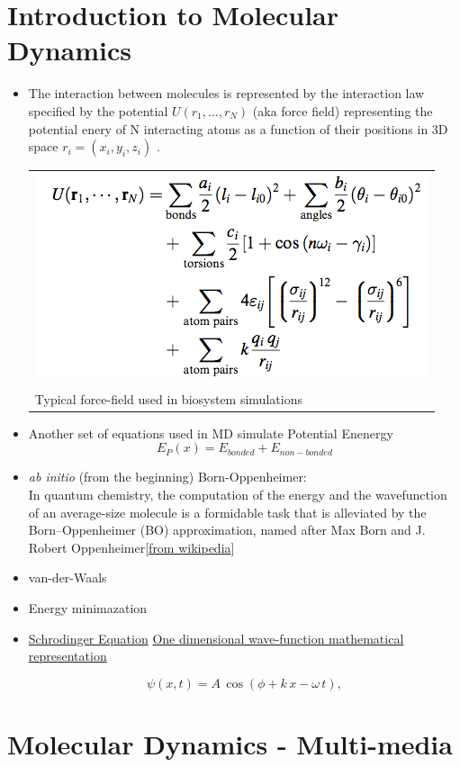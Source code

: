 \documentclass[10pt, a5paper]{article}
\begin{document}
\section{Introduction to Molecular Dynamics}

\begin{itemize}
\item
The interaction between molecules is represented by the interaction law specified by the potential $U(r_1,\dots, r_N)$ (aka force field) representing the potential enery of N interacting atoms as a function of their positions in 3D space $r_i = (x_i, y_i, z_i)$ \cite{meller-2001}.

\noindent\begin{tabularx}{\textwidth}{X}
\includegraphics[scale=.5]{figures/ff-eqn1.png} \\
 \tiny{Typical force-field used in biosystem simulations }\\
\end{tabularx}

\item 
Another set of equations used in MD simulate Potential Enenergy 
\begin{equation}
 E_P(x) = E_{bonded} + E_{non-bonded}
 \end{equation}

\item
\emph{ab initio} (from the beginning) Born-Oppenheimer:\\
In quantum chemistry, the computation of the energy and the wavefunction of an average-size molecule is a formidable task that is alleviated by the Born–Oppenheimer (BO) approximation, named after Max Born and J. Robert Oppenheimer[\href{http://en.wikipedia.org/wiki/Born–Oppenheimer_approximation}{from wikipedia}]


\item 
van-der-Waals

\item 
Energy minimazation 

\item 
\href{http://www.physics.sc.edu/~knight/502s08/SE.pdf}{Schrodinger Equation}
\href{http://farside.ph.utexas.edu/teaching/315/Waves/node72.html}{One dimensional wave-function mathematical representation}

	\begin{equation}
	\psi(x,t) = A\,\cos(\phi+k\,x-\omega\,t),
	\end{equation}

\end{itemize}
\section{Molecular Dynamics - Multi-media}
\end{document}
